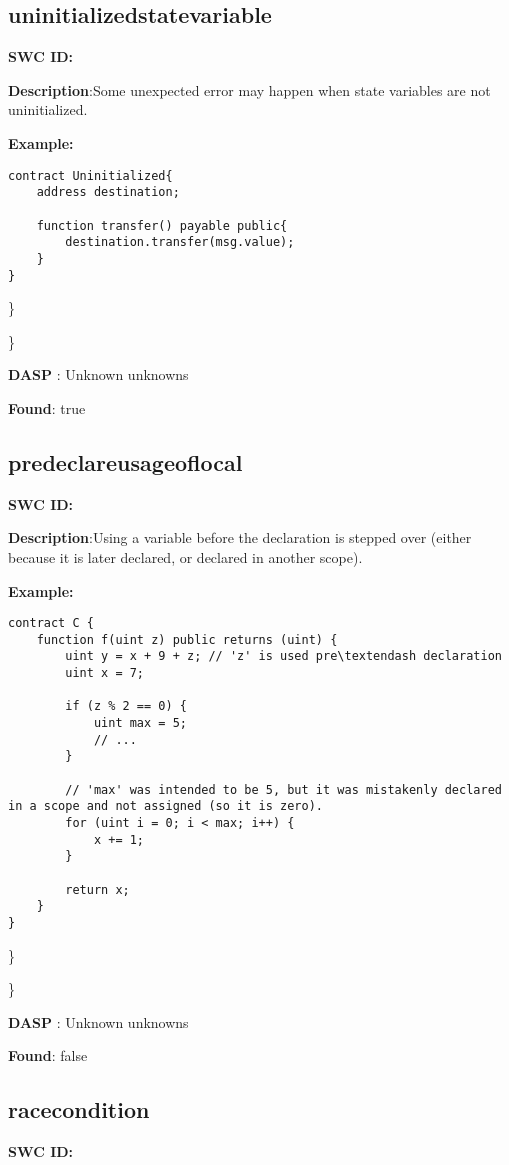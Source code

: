 \documentclass{article}
\begin{document}
\subsection{uninitialized\textunderscore state\textunderscore variable} 
\textbf{SWC \textunderscore ID:} 

\textbf{Description}:Some unexpected error may happen when state variables are not uninitialized.


\textbf{Example:} 
\begin{verbatim}
contract Uninitialized{
    address destination;

    function transfer() payable public{
        destination.transfer(msg.value);
    }
}

\end{verbatim}\} 

\} 

\textbf{DASP} : Unknown unknowns

\textbf{Found}: true

\subsection{pre\textendash declare\textunderscore usage\textunderscore of\textunderscore local} 
\textbf{SWC \textunderscore ID:} 

\textbf{Description}:Using a variable before the declaration is stepped over (either because it is later declared, or declared in another scope).


\textbf{Example:} 
\begin{verbatim}
contract C {
    function f(uint z) public returns (uint) {
        uint y = x + 9 + z; // 'z' is used pre\textendash declaration
        uint x = 7;

        if (z % 2 == 0) {
            uint max = 5;
            // ...
        }

        // 'max' was intended to be 5, but it was mistakenly declared in a scope and not assigned (so it is zero).
        for (uint i = 0; i < max; i++) {
            x += 1;
        }

        return x;
    }
}

\end{verbatim}\} 

\} 

\textbf{DASP} : Unknown unknowns

\textbf{Found}: false

\subsection{race\textunderscore condition} 
\textbf{SWC \textunderscore ID:} 
\end{document}
